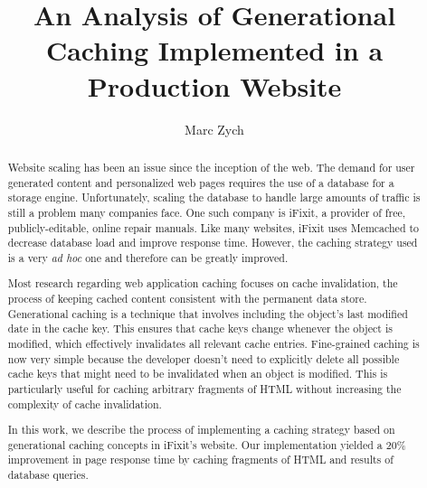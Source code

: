 \documentclass[12pt]{ucthesis}
\begin{document}

\title{An Analysis of Generational Caching Implemented in a Production Website}
\author{Marc Zych}
  
 
     



\maketitle

\begin{frontmatter}

\copyrightpage

\committeemembershippage

\begin{abstract}
Website scaling has been an issue since the inception of the web.
The demand for user generated content and personalized web pages requires the use of a database for a storage engine.
Unfortunately, scaling the database to handle large amounts of traffic is still a problem many companies face.
One such company is \textsf{iFixit}, a provider of free, publicly-editable, online repair manuals.
Like many websites, \textsf{iFixit} uses \textsf{Memcached} to decrease database load and improve response time.
However, the caching strategy used is a very \textit{ad hoc} one and therefore can be greatly improved.

Most research regarding web application caching focuses on cache invalidation, the process of keeping cached content consistent with the permanent data store.
Generational caching is a technique that involves including the object's last modified date in the cache key.
This ensures that cache keys change whenever the object is modified, which effectively invalidates all relevant cache entries.
Fine-grained caching is now very simple because the developer doesn't need to explicitly delete all possible cache keys that might need to be invalidated when an object is modified.
This is particularly useful for caching arbitrary fragments of HTML without increasing the complexity of cache invalidation.

In this work, we describe the process of implementing a caching strategy based on generational caching concepts in \textsf{iFixit}'s website.
Our implementation yielded a 20\% improvement in page response time by caching fragments of HTML and results of database queries.
\end{abstract}


\tableofcontents


\listoftables

\listoffigures

\end{frontmatter}
\end{document}

